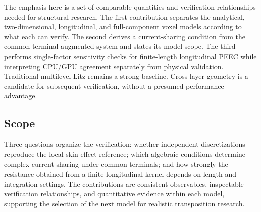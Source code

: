 \documentclass[journal,10pt]{IEEEtran}
\begin{document}
The emphasis here is a set of comparable quantities and verification relationships needed for structural research. The first contribution separates the analytical, two-dimensional, longitudinal, and full-component voxel models according to what each can verify. The second derives a current-sharing condition from the common-terminal augmented system and states its model scope. The third performs single-factor sensitivity checks for finite-length longitudinal PEEC while interpreting CPU/GPU agreement separately from physical validation. Traditional multilevel Litz remains a strong baseline. Cross-layer geometry is a candidate for subsequent verification, without a presumed performance advantage.


\subsection*{Scope}
\hypertarget{01.scope.heading}{}
Three questions organize the verification: whether independent discretizations reproduce the local skin-effect reference; which algebraic conditions determine complex current sharing under common terminals; and how strongly the resistance obtained from a finite longitudinal kernel depends on length and integration settings. The contributions are consistent observables, inspectable verification relationships, and quantitative evidence within each model, supporting the selection of the next model for realistic transposition research.
\end{document}
